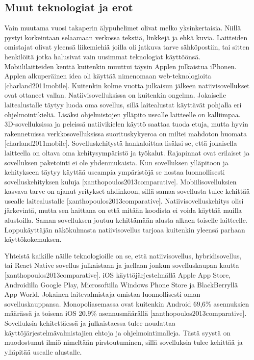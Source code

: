 \documentclass{tktltiki}
\begin{document}
\subsection{Muut teknologiat ja erot}

Vain muutama vuosi takaperin älypuhelimet olivat melko yksinkertaisia. Niillä pystyi korkeintaan selaamaan verkossa tekstiä, linkkejä ja ehkä kuvia. Laitteiden omistajat olivat yleensä liikemiehiä joilla oli jatkuva tarve sähköpostiin, tai sitten henkilöitä jotka halusivat vain uusimmat teknologiat käyttöönsä. Mobiililaitteiden kenttä kuitenkin muuttui täysin Applen julkaistua iPhonen. Applen alkuperäinen idea oli käyttää nimenomaan web-teknologioita [charland2011mobile]. Kuitenkin kolme vuotta julkaisun jälkeen natiivisovellukset ovat ottaneet vallan. Natiivisovelluksissa on kuitenkin ongelma. Jokaiselle laitealustalle täytyy luoda oma sovellus, sillä laitealustat käyttävät pohjalla eri ohjelmointikieliä. Lisäksi ohjelmistojen ylläpito usealle laitteelle on kalliimpaa. 3D-sovelluksissa ja peleissä natiivikielen käyttö saattaa tuoda etuja, mutta hyvin rakennetuissa verkkosovelluksissa suorituskykyeroa on miltei mahdoton huomata [charland2011mobile]. Sovelluskehitystä hankaloittaa lisäksi se, että jokaisella laitteella on oltava oma kehitysympäristö ja työkalut. Rajapinnat ovat erilaiset ja sovelluksen paketointi ei ole yhdenmukaista. Kun sovelluksen ylläpitoon ja kehitykseen täytyy käyttää useampia ympäristöjä se nostaa luonnollisesti sovelluskehityksen kuluja [xanthopoulos2013comparative]. Mobiilisovelluksien kasvava tarve on ajanut yritykset ahdinkoon, sillä samaa sovellusta tulee kehittää usealle laitealustalle [xanthopoulos2013comparative]. Natiivisovelluskehitys olisi järkevintä, mutta sen haittana on että mitään koodista ei voida käyttää muilla alustoilla. Saman sovelluksen joutuu kehittämään alusta alkaen toiselle laitteelle. Loppukäyttäjän näkökulmasta natiivisovellus tarjoaa kuitenkin yleensä parhaan käyttökokemuksen.

Yhteistä kaikille näille teknologioille on se, että natiivisovellus, hybridisovellus, tai React Native sovellus julkaistaan ja jaellaan jonkun sovelluskaupan kautta [xanthopoulos2013comparative]. iOS käyttöjärjestelmällä Apple App Store, Androidilla Google Play, Microsoftilla Windows Phone Store ja BlackBerryllä App World. Jokainen laitevalmistaja omistaa luonnollisesti oman sovelluskauppansa. Monopoliasemassa ovat kuitenkin Android 69,6\% asennuksien määrässä ja toisena iOS 20.9\% asennusmäärällä [xanthopoulos2013comparative]. Sovelluksia kehitettäessä ja julkaistaessa tulee noudattaa käyttöjärjestelmävalmistajien ehtoja ja ohjelmointimalleja. Tästä syystä on muodostunut ilmiö nimeltään pirstoutuminen, sillä sovelluksia tulee kehittää ja ylläpitää usealle alustalle. 
\end{document}

